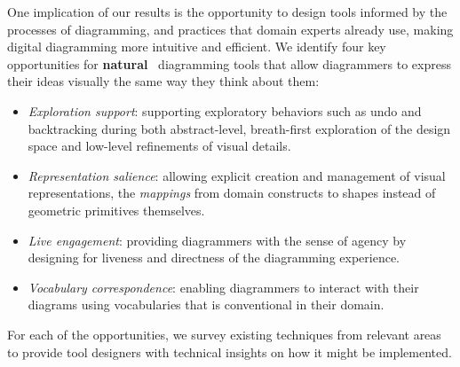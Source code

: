 One implication of our results is the opportunity to design tools informed by the processes of diagramming, and practices that domain experts already use, making digital diagramming more intuitive and efficient. We identify four key opportunities for \textbf{natural}~\cite{myers_natural_2004} diagramming tools that allow diagrammers to express their ideas visually the same way they think about them:
%
\begin{itemize} [noitemsep,topsep=-4pt,parsep=2pt,partopsep=0pt]
    \item \textit{Exploration support}: supporting exploratory behaviors such as undo and backtracking during both abstract-level, breath-first exploration of the design space and low-level refinements of visual details.
    \item \textit{Representation salience}: allowing explicit creation and management of visual representations, \ie{} the \emph{mappings} from domain constructs to shapes instead of geometric primitives themselves.
    \item \textit{Live engagement}: providing diagrammers with the sense of agency by designing for liveness and directness of the diagramming experience. 
    \item \textit{Vocabulary correspondence}: enabling diagrammers to interact with their diagrams using vocabularies that is conventional in their domain.
\end{itemize}
%
For each of the opportunities, we survey existing techniques from relevant areas to provide tool designers with technical insights on how it might be implemented.



